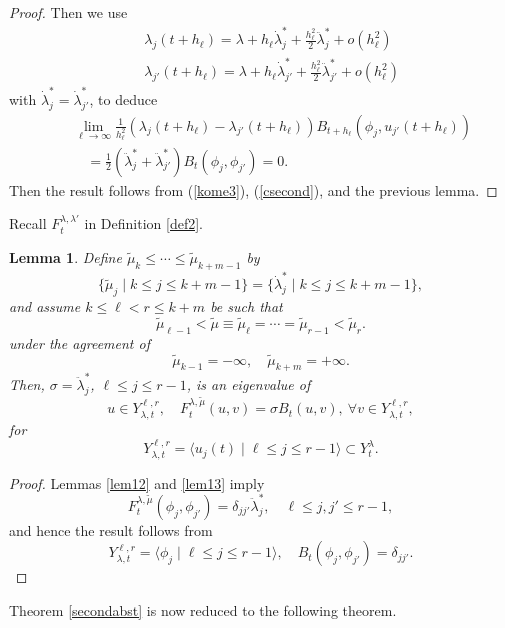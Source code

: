 \documentclass[final,a4paper]{jmsj}
\theoremstyle{thmstyleone}%
\theoremstyle{thmstyletwo}%
\theoremstyle{thmstylethree}%
\newtheorem{lemma}[theorem]{Lemma}
\begin{document}
\begin{proof}
Then we use  
\begin{eqnarray*} 
& & \lambda_j(t+h_\ell)=\lambda+h_\ell \dot \lambda_j^\ast+\frac{h_\ell^2}{2}\ddot \lambda_j^\ast+o(h_\ell^2) \\ 
& & \lambda_{j'}(t+h_\ell)=\lambda+h_\ell \dot \lambda_{j'}^\ast+\frac{h_\ell^2}{2}\ddot \lambda_{j'}^\ast+o(h_\ell^2) 
\end{eqnarray*}
with $\dot \lambda_j^\ast=\dot\lambda_{j'}^\ast$, to deduce  
\begin{eqnarray*} 
& & \lim_{\ell\rightarrow
 \infty}\frac{1}{h_\ell^2}(\lambda_j(t+h_\ell)-\lambda_{j'}(t+h_\ell))B_{t+h_\ell}(\phi_j,  u_{j'}(t+h_\ell)) \\  
& & \quad = \frac{1}{2}(\ddot \lambda_j^\ast+\ddot \lambda_{j'}^\ast)B_t(\phi_j, \phi_{j'})=0.  
\end{eqnarray*} 
Then the result follows from (\ref{kome3}), (\ref{csecond}), and the previous lemma. 
\end{proof} 

Recall $F^{\lambda, \lambda'}_t$ in Definition \ref{def2}. 

\begin{lemma} 
Define  
$\tilde \mu_k\leq \cdots \leq \tilde\mu_{k+m-1}$ 
by 
\[ \{ \tilde \mu_j \mid k\leq j\leq k+m-1\}=\{ \dot \lambda_j^\ast \mid k\leq j\leq k+m-1\}, \] 
and assume $k\leq \ell<r\leq k+m$ be such that  
\[ \tilde \mu_{\ell-1}<\tilde \mu\equiv \tilde \mu_{\ell}=\cdots = \tilde \mu_{r-1}<\tilde \mu_{r}. \] 
under the agreement of 
\[ \tilde \mu_{k-1}=-\infty, \quad \tilde\mu_{k+m}=+\infty. \] 
Then, $\sigma=\ddot \lambda_j^\ast$, $\ell\leq j\leq r-1$, is an eigenvalue of  
\[ u\in Y_{\lambda,t}^{\ell, r}, \quad F^{\lambda, \tilde \mu}_t(u,v)=\sigma B_t(u,v), \ \forall v\in Y_{\lambda,t}^{\ell, r}, \]
for 
\[ Y_{\lambda,t}^{\ell,r}=\langle u_j(t) \mid \ell\leq j\leq r-1\rangle \subset Y^\lambda_t. \] 
\end{lemma} 

\begin{proof} 
Lemmas \ref{lem12} and \ref{lem13} imply 
\[ F^{\lambda, \tilde \mu}_t(\phi_j, \phi_{j'})=\delta_{jj'}\ddot \lambda_j^\ast, \quad \ell\leq j, j'\leq r-1, \] 
and hence the result follows from  
\[ Y_{\lambda,t}^{\ell,r}=\langle \phi_j \mid \ell\leq j\leq r-1\rangle, \quad B_t(\phi_j, \phi_{j'})=\delta_{jj'}. \]  
\end{proof} 

Theorem \ref{secondabst} is now reduced to the following theorem. 
\end{document}
